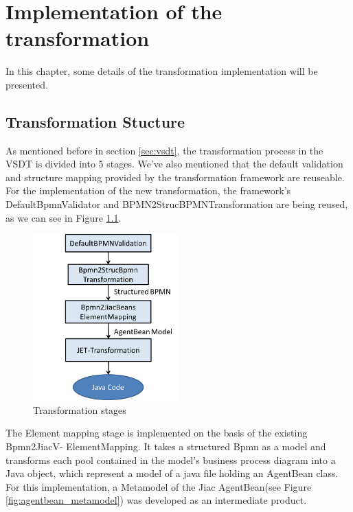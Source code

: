 \chapter{Implementation of the transformation}
\label{chap:implementation}
In this chapter, some details of the transformation implementation will be presented. 

\section{Transformation Stucture}
As mentioned before in section \ref{sec:vsdt}, the transformation process in the VSDT is divided into 5 stages. We've also mentioned that the default validation and structure mapping provided by the transformation framework are reuseable. For the implementation of the new transformation, the framework's DefaultBpmnValidator and BPMN2StrucBPMNTransformation are being reused, as we can see in Figure \ref{fig:implementation_stages}.

\begin{figure}[h]
	\centering		\includegraphics[width=0.5\textwidth]{images/implementation_stages.png}
	\caption{Transformation stages}
	\label{fig:implementation_stages}
\end{figure}

The Element mapping stage is implemented on the basis of the existing Bpmn2JiacV- ElementMapping. It takes a structured Bpmn as a model and transforms each pool contained in the model's business process diagram into a Java object, which represent a model of a java file holding an AgentBean class. For this implementation, a Metamodel of the Jiac AgentBean(see Figure \ref{fig:agentbean_metamodel}) was developed as an intermediate product. 

